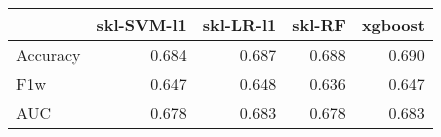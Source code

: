 \begin{tabular}{lrrrr}
\toprule
{} &  skl-SVM-l1 &  skl-LR-l1 &  skl-RF &  xgboost \\
\midrule
Accuracy &       0.684 &      0.687 &   0.688 &    0.690 \\
F1w      &       0.647 &      0.648 &   0.636 &    0.647 \\
AUC      &       0.678 &      0.683 &   0.678 &    0.683 \\
\bottomrule
\end{tabular}
